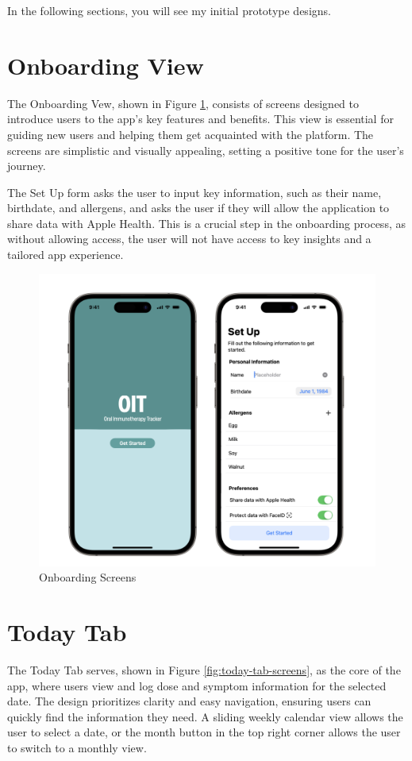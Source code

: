 In the following sections, you will see my initial prototype designs.

\section{Onboarding View}

The Onboarding Vew, shown in Figure \ref{fig:onboarding-screens}, consists of screens designed to introduce users to the app's key features and benefits. This view is essential for guiding new users and helping them get acquainted with the platform. The screens are simplistic and visually appealing, setting a positive tone for the user's journey.

The Set Up form asks the user to input key information, such as their name, birthdate, and allergens, and asks the user if they will allow the application to share data with Apple Health. This is a crucial step in the onboarding process, as without allowing access, the user will not have access to key insights and a tailored app experience.

\begin{figure}[H]
    \centering
    \includegraphics[width=0.5\linewidth]{thesis//chapters//images/onboarding-screens.png}
    \caption{Onboarding Screens}
    \label{fig:onboarding-screens}
\end{figure}

\section{Today Tab}

The Today Tab serves, shown in Figure \ref{fig:today-tab-screens}, as the core of the app, where users view and log dose and symptom information for the selected date. The design prioritizes clarity and easy navigation, ensuring users can quickly find the information they need. A sliding weekly calendar view allows the user to select a date, or the month button in the top right corner allows the user to switch to a monthly view. 

